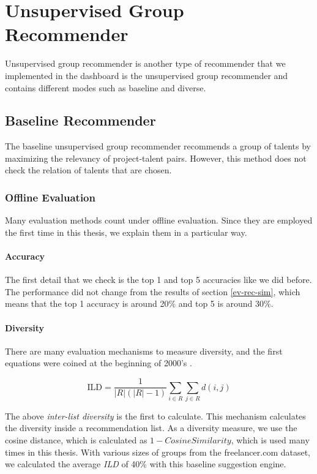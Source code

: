 \section{Unsupervised Group Recommender}

Unsupervised group recommender is another type of recommender that we implemented in the dashboard is the unsupervised group recommender and contains different modes such as baseline and diverse. 

\subsection{Baseline Recommender}

The baseline unsupervised group recommender recommends a group of talents by maximizing the relevancy of project-talent pairs. However, this method does not check the relation of talents that are chosen. 

\subsubsection{Offline Evaluation}

Many evaluation methods count under offline evaluation. Since they are employed the first time in this thesis, we explain them in a particular way.

\paragraph{Accuracy}

The first detail that we check is the top 1 and top 5 accuracies like we did before. The performance did not change from the results of section \ref{ev-rec-sim}, which means that the top 1 accuracy is around 20\% and top 5 is around 30\%.

\paragraph{Diversity}\label{ev-unsupervised-group-diversity}

There are many evaluation mechanisms to measure diversity, and the first equations were coined at the beginning of 2000's \cite{smyth2001similarity}.

$$\mathrm { ILD } = \frac { 1 } { | R | ( | R | - 1 ) } \sum _ { i \in R } \sum _ { j \in R } d ( i , j )$$

The above \textit{inter-list diversity} is the first to calculate. This mechanism calculates the diversity inside a recommendation list. As a diversity measure, we use the cosine distance, which is calculated as $1 - Cosine Similarity$, which is used many times in this thesis. With various sizes of groups from the freelancer.com dataset, we calculated the average \textit{ILD} of 40\% with this baseline suggestion engine.

